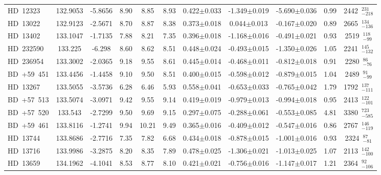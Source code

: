 {\begin{longtable}{lcccccccccc}
\noalign{\smallskip}
HD~12323 & 132.9053 & -5.8656 & 8.90 & 8.85 & 8.93 & 0.422$\pm$0.033 & -1.349$\pm$0.019 & -5.690$\pm$0.036 & 0.99 & 2442~$_{-218}^{231}$ \\
\noalign{\smallskip}
HD~13022 & 132.9123 & -2.5671 & 8.70 & 8.87 & 8.38 & 0.373$\pm$0.018 & 0.044$\pm$0.013 & -0.167$\pm$0.020 & 0.89 & 2665~$_{-136}^{134}$ \\
\noalign{\smallskip}
HD~13402 & 133.1047 & -1.7135 & 7.88 & 8.21 & 7.35 & 0.396$\pm$0.018 & -1.168$\pm$0.016 & -0.491$\pm$0.021 & 0.93 & 2519~$_{-99}^{118}$ \\
\noalign{\smallskip}
HD~232590 & 133.225 & -6.298 & 8.60 & 8.62 & 8.51 & 0.448$\pm$0.024 & -0.493$\pm$0.015 & -1.350$\pm$0.026 & 1.05 & 2241~$_{-132}^{145}$ \\
\noalign{\smallskip}
HD~236954 & 133.3002 & -2.0365 & 9.18 & 9.55 & 8.61 & 0.445$\pm$0.014 & -0.468$\pm$0.011 & -0.812$\pm$0.018 & 0.91 & 2280~$_{-76}^{86}$ \\
\noalign{\smallskip}
BD~+59~451 & 133.4456 & -1.4458 & 9.10 & 9.50 & 8.51 & 0.400$\pm$0.015 & -0.598$\pm$0.012 & -0.879$\pm$0.015 & 1.04 & 2489~$_{-99}^{91}$ \\
\noalign{\smallskip}
HD~13267 & 133.5055 & -3.5736 & 6.28 & 6.46 & 5.93 & 0.558$\pm$0.041 & -0.653$\pm$0.033 & -0.765$\pm$0.042 & 1.79 & 1792~$_{-111}^{137}$ \\
\noalign{\smallskip}
BD~+57~513 & 133.5074 & -3.0971 & 9.42 & 9.55 & 9.14 & 0.419$\pm$0.019 & -0.979$\pm$0.013 & -0.994$\pm$0.018 & 0.95 & 2413~$_{-101}^{122}$ \\
\noalign{\smallskip}
BD~+57~520 & 133.543 & -2.7299 & 9.50 & 9.69 & 9.15 & 0.297$\pm$0.075 & -0.288$\pm$0.061 & -0.553$\pm$0.085 & 4.81 & 3380~$_{-585}^{723}$ \\
\noalign{\smallskip}
BD~+59~461 & 133.8116 & -1.2741 & 9.94 & 10.21 & 9.49 & 0.365$\pm$0.016 & -0.409$\pm$0.012 & -0.547$\pm$0.016 & 0.86 & 2767~$_{-119}^{146}$ \\
\noalign{\smallskip}
HD~13744 & 133.8686 & -2.7716 & 7.35 & 7.82 & 6.68 & 0.434$\pm$0.018 & -0.878$\pm$0.015 & -1.001$\pm$0.016 & 0.93 & 2324~$_{-81}^{87}$ \\
\noalign{\smallskip}
HD~13716 & 133.9986 & -3.2875 & 8.20 & 8.35 & 7.89 & 0.478$\pm$0.025 & -1.306$\pm$0.021 & -1.013$\pm$0.025 & 1.07 & 2113~$_{-100}^{142}$ \\
\noalign{\smallskip}
HD~13659 & 134.1962 & -4.1041 & 8.53 & 8.77 & 8.10 & 0.421$\pm$0.021 & -0.756$\pm$0.016 & -1.147$\pm$0.017 & 1.21 & 2364~$_{-106}^{92}$ \\

\end{longtable}}
